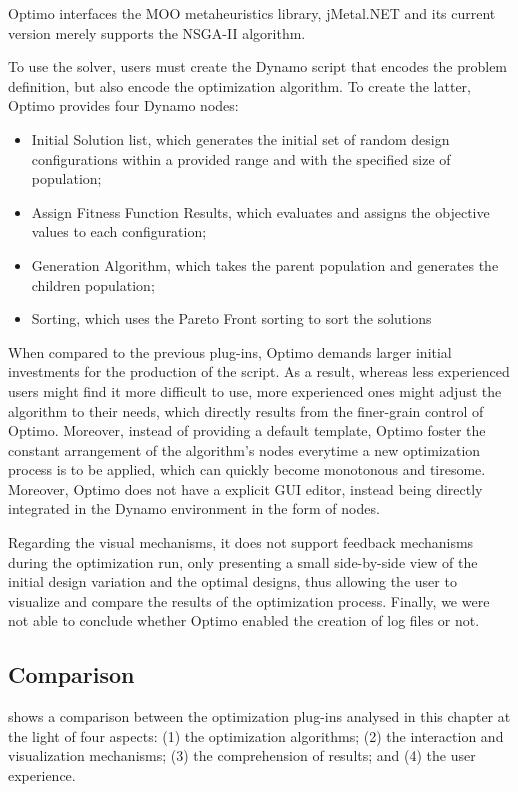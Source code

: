 Optimo interfaces the \ac{MOO} metaheuristics library, jMetal.NET and its current version merely supports the \ac{NSGA-II} algorithm\cite{Deb2002}.

To use the solver, users must create the Dynamo script that encodes the problem definition, but also encode the optimization algorithm. To create the latter, Optimo provides four Dynamo nodes:
\begin{itemize}
	\item Initial Solution list, which generates the initial set of random design configurations within a provided range and with the specified size of population;
	\item Assign Fitness Function Results, which evaluates and assigns the objective values to each configuration; 
	\item Generation Algorithm, which takes the parent population and generates the children population;
	\item Sorting, which uses the Pareto Front sorting to sort the solutions
\end{itemize} 

When compared to the previous plug-ins, Optimo demands larger initial investments for the production of the script. As a result, whereas less experienced users might find it more difficult to use, more experienced ones might adjust the algorithm to their needs, which directly results from the finer-grain control of Optimo. Moreover, instead of providing a default template, Optimo foster the constant arrangement of the algorithm's nodes everytime a new optimization process is to be applied, which can quickly become monotonous and tiresome. Moreover, Optimo does not have a explicit \ac{GUI} editor, instead being directly integrated in the Dynamo environment in the form of nodes.

Regarding the visual mechanisms, it does not support feedback mechanisms during the optimization run, only presenting a small side-by-side view of the initial design variation and the optimal designs, thus allowing the user to visualize and compare the results of the optimization process. Finally, we were not able to conclude whether Optimo enabled the creation of log files or not. 

\subsection{Comparison}

 shows a comparison between the optimization plug-ins analysed in this chapter at the light of four aspects: (1) the optimization algorithms; (2) the interaction and visualization mechanisms; (3) the comprehension of results; and (4) the user experience.

